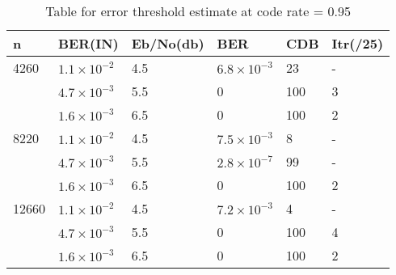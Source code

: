 \begin{table}[H]
\centering
\caption[Table for error threshold estimate at code rate = 0.95, Min Sum decode using quasi cyclic matrix]{Table for error threshold estimate at code rate = 0.95}
\begin{tabular}{|l|l|l|l|l|l|}
\hline
n     & BER(IN)& Eb/No(db) & BER    & CDB & Itr(/25) \\ \hline
4260  & $1.1\times10^{-2}$ & 4.5   & $6.8\times10^{-3}$      & 23 &  -       \\ 
      & $4.7\times10^{-3}$ & 5.5   & 0           & 100 & 3         \\  
      & $1.6\times10^{-3}$ & 6.5   & 0           & 100 & 2         \\ \hline
8220  & $1.1\times10^{-2}$ & 4.5   & $7.5\times10^{-3}$      & 8 & -         \\ 
      & $4.7\times10^{-3}$ & 5.5   & $2.8\times10^{-7}$      & 99 & -         \\ 
      & $1.6\times10^{-3}$ & 6.5   & 0      & 100 & 2         \\ \hline
12660 & $1.1\times10^{-2}$ & 4.5   & $7.2\times10^{-3}$      & 4 & -        \\ 
      & $4.7\times10^{-3}$ & 5.5   & 0      & 100 & 4         \\ 
      & $1.6\times10^{-3}$ & 6.5   & 0      & 100 & 2         \\ \hline      
\end{tabular}
\label{tab:nameForThisTable}
\end{table}

